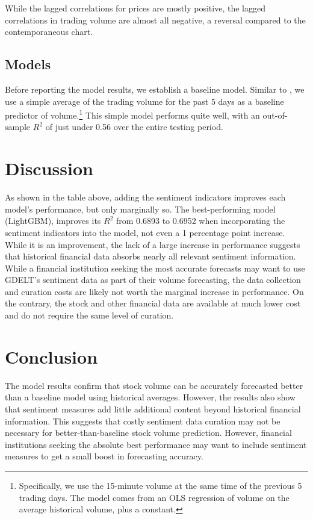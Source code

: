 \documentclass[12pt]{article}
\begin{document}
While the lagged correlations for prices are mostly positive, the lagged correlations in trading volume are almost all negative, a reversal compared to the contemporaneous chart.


\subsection{Models}
Before reporting the model results, we establish a baseline model. Similar to \textcite{goyenko2024trading}, we use a simple average of the trading volume for the past 5 days as a baseline predictor of volume.\footnote{Specifically, we use the 15-minute volume at the same time of the previous 5 trading days. The model comes from an OLS regression of volume on the average historical volume, plus a constant.} This simple model performs quite well, with an out-of-sample $R^2$ of just under 0.56 over the entire testing period.



\newpage
\section{Discussion}

As shown in the table above, adding the sentiment indicators improves each model's performance, but only marginally so. The best-performing model (LightGBM), improves its $R^2$ from 0.6893 to 0.6952 when incorporating the sentiment indicators into the model, not even a 1 percentage point increase. While it is an improvement, the lack of a large increase in performance suggests that historical financial data absorbs nearly all relevant sentiment information. While a financial institution seeking the most accurate forecasts may want to use GDELT's sentiment data as part of their volume forecasting, the data collection and curation costs are likely not worth the marginal increase in performance. On the contrary, the stock and other financial data are available at much lower cost and do not require the same level of curation.

\section{Conclusion}
The model results confirm that stock volume can be accurately forecasted better than a baseline model using historical averages. However, the results also show that sentiment measures add little additional content beyond historical financial information. This suggests that costly sentiment data curation may not be necessary for better-than-baseline stock volume prediction. However, financial institutions seeking the absolute best performance may want to include sentiment measures to get a small boost in forecasting accuracy.

\newpage
\printbibliography
\end{document}
